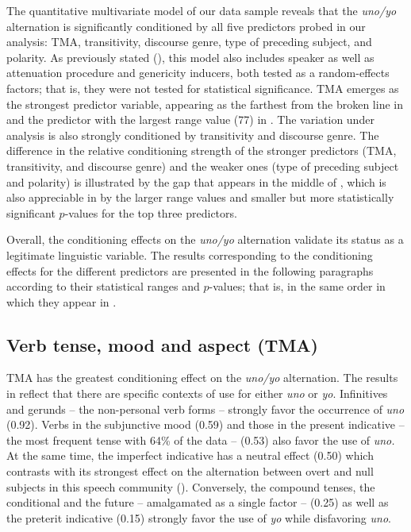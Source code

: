 \documentclass[output=paper]{langscibook}
\begin{document}
The quantitative multivariate model of our data sample reveals that the \textit{uno/yo} alternation is significantly conditioned by all five predictors probed in our analysis: TMA, transitivity, discourse genre, type of preceding subject, and polarity. As previously stated (), this model also includes speaker as well as attenuation procedure and genericity inducers, both tested as a random-effects factors; that is, they were not tested for statistical significance. TMA emerges as the strongest predictor variable, appearing as the farthest from the broken line in  and the predictor with the largest range value (77) in . The variation under analysis is also strongly conditioned by transitivity and discourse genre. The difference in the relative conditioning strength of the stronger predictors (TMA, transitivity, and discourse genre) and the weaker ones (type of preceding subject and polarity) is illustrated by the gap that appears in the middle of , which is also appreciable in  by the larger range values and smaller but more statistically significant $p$-values for the top three predictors. 



Overall, the conditioning effects on the \textit{uno/yo} alternation validate its status as a legitimate linguistic variable. The results corresponding to the conditioning effects for the different predictors are presented in the following paragraphs according to their statistical ranges and $p$-values; that is, in the same order in which they appear in .


\subsection{Verb tense, mood and aspect (TMA)}\label{sec:orozco:4.3}

TMA has the greatest conditioning effect on the \textit{uno/yo} alternation. The results in  reflect that there are specific contexts of use for either \textit{uno} or \textit{yo}. Infinitives and gerunds – the non-personal verb forms – strongly favor the occurrence of \textit{uno} (0.92). Verbs in the subjunctive mood (0.59) and those in the present indicative – the most frequent tense with 64\% of the data – (0.53) also favor the use of \textit{uno.} At the same time, the imperfect indicative has a neutral effect (0.50) which contrasts with its strongest effect on the alternation between overt and null subjects in this speech community (\citealt{OrozcoHurtado2021}). Conversely, the compound tenses, the conditional and the future – amalgamated as a single factor – (0.25) as well as the preterit indicative (0.15) strongly favor the use of \textit{yo} while disfavoring \textit{uno}. 
\end{document}
